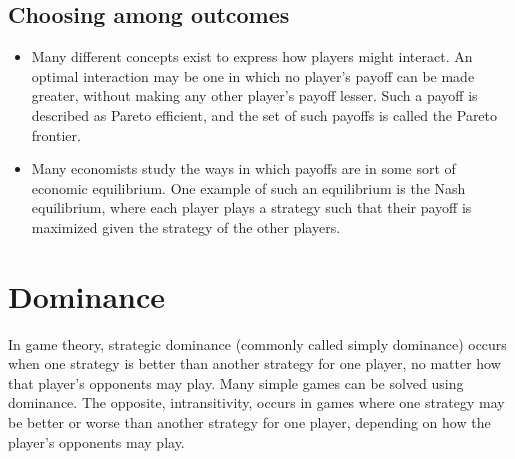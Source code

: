 \documentclass[]{report}
\begin{document}
\subsection{Choosing among outcomes}
\begin{itemize}
\item Many different concepts exist to express how players might interact. An optimal interaction may be one in which no player's payoff can be made greater, without making any other player's payoff lesser. Such a payoff is described as Pareto efficient, and the set of such payoffs is called the Pareto frontier.
\item 
Many economists study the ways in which payoffs are in some sort of economic equilibrium. One example of such an equilibrium is the Nash equilibrium, where each player plays a strategy such that their payoff is maximized given the strategy of the other players.
\end{itemize}

\section{Dominance}
In game theory, strategic dominance (commonly called simply dominance) occurs when one strategy is better than another strategy for one player, no matter how that player's opponents may play. Many simple games can be solved using dominance. The opposite, intransitivity, occurs in games where one strategy may be better or worse than another strategy for one player, depending on how the player's opponents may play.

\end{document}
